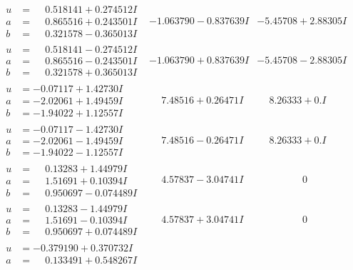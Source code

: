 \documentclass[1p]{elsarticle_modified}
\theoremstyle{definition}
\begin{document}
$$\begin{array}{c|c|c}
\begin{aligned}
u &= \phantom{-}0.518141 + 0.274512 I \\
a &= \phantom{-}0.865516 + 0.243501 I \\
b &= \phantom{-}0.321578 - 0.365013 I\end{aligned}
 & -1.063790 - 0.837639 I & -5.45708 + 2.88305 I \\ \hline\begin{aligned}
u &= \phantom{-}0.518141 - 0.274512 I \\
a &= \phantom{-}0.865516 - 0.243501 I \\
b &= \phantom{-}0.321578 + 0.365013 I\end{aligned}
 & -1.063790 + 0.837639 I & -5.45708 - 2.88305 I \\ \hline\begin{aligned}
u &= -0.07117 + 1.42730 I \\
a &= -2.02061 + 1.49459 I \\
b &= -1.94022 + 1.12557 I\end{aligned}
 & \phantom{-}7.48516 + 0.26471 I & \phantom{-}8.26333 + 0. I\phantom{ +0.000000I} \\ \hline\begin{aligned}
u &= -0.07117 - 1.42730 I \\
a &= -2.02061 - 1.49459 I \\
b &= -1.94022 - 1.12557 I\end{aligned}
 & \phantom{-}7.48516 - 0.26471 I & \phantom{-}8.26333 + 0. I\phantom{ +0.000000I} \\ \hline\begin{aligned}
u &= \phantom{-}0.13283 + 1.44979 I \\
a &= \phantom{-}1.51691 + 0.10394 I \\
b &= \phantom{-}0.950697 - 0.074489 I\end{aligned}
 & \phantom{-}4.57837 - 3.04741 I & \phantom{-0.000000 } 0 \\ \hline\begin{aligned}
u &= \phantom{-}0.13283 - 1.44979 I \\
a &= \phantom{-}1.51691 - 0.10394 I \\
b &= \phantom{-}0.950697 + 0.074489 I\end{aligned}
 & \phantom{-}4.57837 + 3.04741 I & \phantom{-0.000000 } 0 \\ \hline\begin{aligned}
u &= -0.379190 + 0.370732 I \\
a &= \phantom{-}0.133491 + 0.548267 I \\

\end{aligned}
\end{array}$$
\end{document}
